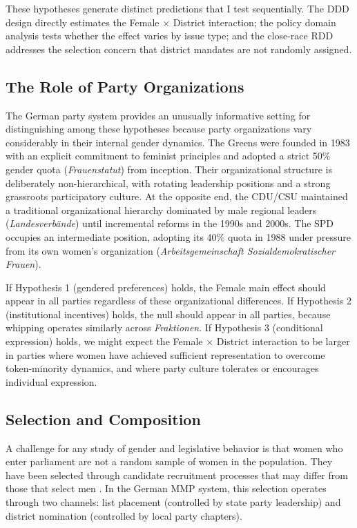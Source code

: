 \documentclass[12pt]{article}
\begin{document}
These hypotheses generate distinct predictions that I test sequentially. The DDD design directly estimates the Female $\times$ District interaction; the policy domain analysis tests whether the effect varies by issue type; and the close-race RDD addresses the selection concern that district mandates are not randomly assigned.

\subsection{The Role of Party Organizations}

The German party system provides an unusually informative setting for distinguishing among these hypotheses because party organizations vary considerably in their internal gender dynamics. The Greens were founded in 1983 with an explicit commitment to feminist principles and adopted a strict 50\% gender quota (\textit{Frauenstatut}) from inception. Their organizational structure is deliberately non-hierarchical, with rotating leadership positions and a strong grassroots participatory culture. At the opposite end, the CDU/CSU maintained a traditional organizational hierarchy dominated by male regional leaders (\textit{Landesverb\"ande}) until incremental reforms in the 1990s and 2000s. The SPD occupies an intermediate position, adopting its 40\% quota in 1988 under pressure from its own women's organization (\textit{Arbeitsgemeinschaft Sozialdemokratischer Frauen}).

If Hypothesis 1 (gendered preferences) holds, the Female main effect should appear in all parties regardless of these organizational differences. If Hypothesis 2 (institutional incentives) holds, the null should appear in all parties, because whipping operates similarly across \textit{Fraktionen}. If Hypothesis 3 (conditional expression) holds, we might expect the Female $\times$ District interaction to be larger in parties where women have achieved sufficient representation to overcome token-minority dynamics, and where party culture tolerates or encourages individual expression.

\subsection{Selection and Composition}

A challenge for any study of gender and legislative behavior is that women who enter parliament are not a random sample of women in the population. They have been selected through candidate recruitment processes that may differ from those that select men \citep{norris1997}. In the German MMP system, this selection operates through two channels: list placement (controlled by state party leadership) and district nomination (controlled by local party chapters).
\end{document}
